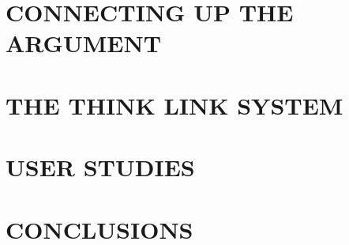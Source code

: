 \documentclass{chi2009}
\begin{document}
\section{CONNECTING UP THE ARGUMENT}

\section{THE THINK LINK SYSTEM}

\section{USER STUDIES}

\section{CONCLUSIONS}



\end{document}
